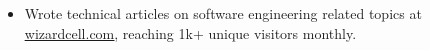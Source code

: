 

\begin{cvparagraph}

\begin{itemize}[leftmargin=*]
    \item Wrote technical articles on software engineering related topics at \href{https://wizardcell.com/}{\underline{wizardcell.com}}, reaching 1k+ unique visitors monthly.
\end{itemize}

\end{cvparagraph}